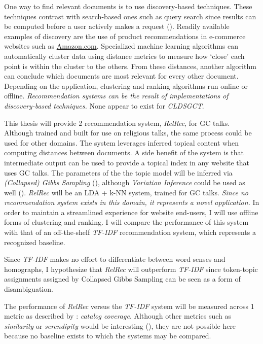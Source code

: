 One way to find relevant documents is to use discovery-based techniques. These techniques contrast with search-based ones such as query search since results can be computed before a user actively makes a request (\citealp{todo}). Readily available examples of discovery are the use of product recommendations in e-commerce websites such as \url{Amazon.com}. Specialized machine learning algorithms can automatically cluster data using distance metrics to measure how `close' each point is within the cluster to the others. From these distances, another algorithm can conclude which documents are most relevant for every other document. Depending on the application, clustering and ranking algorithms run online or offline. \textit{Recommendation systems can be the result of implementations of discovery-based techniques.} None appear to exist for \emph{CLDSGCT}.

This thesis will provide 2 recommendation system, \emph{RelRec}, for GC talks. Although trained and built for use on religious talks, the same process could be used for other domains. The system leverages inferred topical content when computing distances between documents. A side benefit of the system is that intermediate output can be used to provide a topical index in any website that uses GC talks. The parameters of the the topic model will be inferred via \emph{(Collapsed) Gibbs Sampling} (\citealp{Porteous:2008:FCG:1401890.1401960}), although \emph{Variation Inference} could be used as well (\citealp{blei2006variational}). \emph{RelRec} will be an LDA + k-NN system, trained for GC talks. \textit{Since no recommendation system exists in this domain, it represents a novel application.} In order to maintain a streamlined experience for website end-users, I will use offline forms of clustering and ranking. I will compare the performance of this system with that of an off-the-shelf \emph{TF-IDF} recommendation system, which represents a recognized baseline.

Since \emph{TF-IDF} makes no effort to differentiate between word senses and homographs, I hypothesize that \emph{RelRec} will outperform \emph{TF-IDF} since token-topic assignments assigned by Collapsed Gibbs Sampling can be seen as a form of disambiguation.

The performance of \emph{RelRec} versus the \emph{TF-IDF} system will be measured across 1 metric as described by \cite{Ge:2010:BAE:1864708.1864761}: \emph{catalog coverage}. Although other metrics such as \emph{similarity} or \emph{serendipity} would be interesting (\citealp{Ge:2010:BAE:1864708.1864761}), they are not possible here because no baseline exists to which the systems may be compared. %


